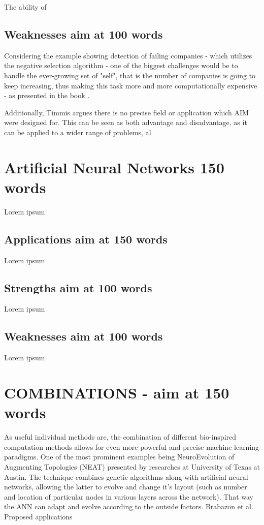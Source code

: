 \documentclass[letterpaper, 10 pt, conference]{ieeeconf}  %
\begin{document}
The ability of 

\subsection{Weaknesses aim at 100 words}
Considering the example showing detection of failing companies - which utilizes the negative selection algorithm - one of the biggest challenges would be to handle the ever-growing set of "self", that is the number of companies is going to keep increasing, thus making this task more and more computationally expensive - as presented in the book \cite{brabazon2006biologically}.

Additionally, Timmis argues \cite{timmis2004overview} there is no precise field or application which AIM were designed for. This can be seen as both advantage and disadvantage, as it can be applied to a wider range of problems, al

\section{Artificial Neural Networks 150 words}
Lorem ipsum

\subsection{Applications aim at 150 words}
Lorem ipsum

\subsection{Strengths aim at 100 words}
Lorem ipsum

\subsection{Weaknesses aim at 100 words}
Lorem ipsum



\section{COMBINATIONS - aim at 150 words}

As useful individual methods are, the combination of different bio-inspired computation methods allows for even more powerful and precise machine learning paradigms. One of the most prominent examples being NeuroEvolution of Augmenting Topologies (NEAT) \cite{stanley2002evolving} presented by researches at University of Texas at Austin. The technique combines genetic algorithms along with artificial neural networks, allowing the latter to evolve and change it's layout (such as number and location of particular nodes in various layers across the network). That way the ANN can adapt and evolve according to the outside factors. Brabazon et al. Proposed applications 
\end{document}
